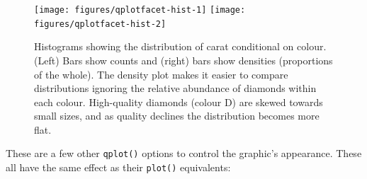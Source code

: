 \begin{Shaded}
\begin{Highlighting}[]
  \StringTok{ }
   \NormalTok{, } \NormalTok{, } \NormalTok{(}\NormalTok{, }\NormalTok{))}
  \StringTok{ }
   \NormalTok{, } \NormalTok{, } \NormalTok{(}\NormalTok{, }\NormalTok{))}
\end{Highlighting}
\end{Shaded}

\begin{figure}

{\centering \texttt{[image: figures/qplotfacet-hist-1]} \texttt{[image: figures/qplotfacet-hist-2]} 

}

\caption{Histograms showing the distribution of carat conditional on colour.  (Left) Bars show counts and (right) bars show densities (proportions of the whole).  The density plot makes it easier to compare distributions ignoring the relative abundance of diamonds within each colour. High-quality diamonds (colour D) are skewed towards small sizes, and as quality declines the distribution becomes more flat.\label{fig:facet-hist}}
\end{figure}


These are a few other \texttt{qplot()} options to control the graphic's
appearance. These all have the same effect as their \texttt{plot()}
equivalents: 


